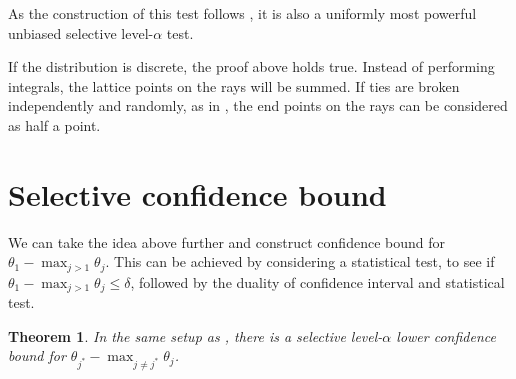 \documentclass[11pt]{article}
\newtheorem{theorem}{Theorem}
\begin{document}
As the construction of this test follows \cite{Fithian:2014ws}, it is also a uniformly most powerful unbiased selective level-$\alpha$ test.

If the distribution is discrete, the proof above holds true. Instead of performing integrals, the lattice points on the rays will be summed. If ties are broken independently and randomly, as in , the end points on the rays can be considered as half a point.

\section{Selective confidence bound}
\label{sec:selective_confidence_bound}

We can take the idea above further and construct confidence bound for $\theta_1 - \max_{j>1} \theta_j$. This can be achieved by considering a statistical test, to see if $\theta_1 - \max_{j>1} \theta_j \le \delta$, followed by the duality of confidence interval and statistical test.

\begin{theorem}
In the same setup as , there is a selective level-$\alpha$ lower confidence bound for $\theta_{j^*} - \max_{j \ne j^*} \theta_j$.
\end{theorem}
\end{document}
